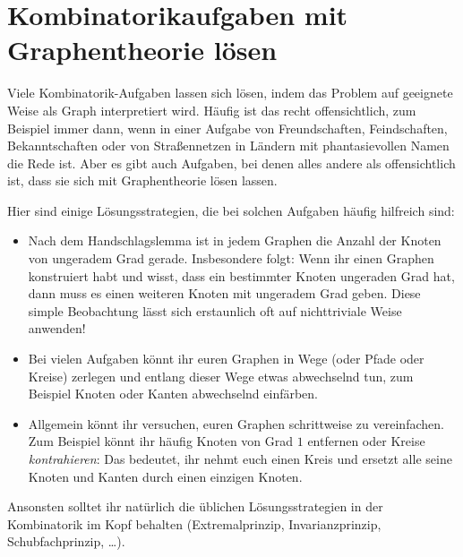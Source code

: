 \section{Kombinatorikaufgaben mit Graphentheorie lösen}\label{kapitel:GraphenInCombo}
Viele Kombinatorik-Aufgaben lassen sich lösen, indem das Problem auf geeignete Weise als Graph interpretiert wird. Häufig ist das recht offensichtlich, zum Beispiel immer dann, wenn in einer Aufgabe von Freundschaften, Feindschaften, Bekanntschaften oder von Straßennetzen in Ländern mit phantasievollen Namen die Rede ist. Aber es gibt auch Aufgaben, bei denen alles andere als offensichtlich ist, dass sie sich mit Graphentheorie lösen lassen.

Hier sind einige Lösungsstrategien, die bei solchen Aufgaben häufig hilfreich sind:
\begin{itemize}
	\item Nach dem Handschlagslemma ist in jedem Graphen die Anzahl der Knoten von ungeradem Grad gerade. Insbesondere folgt: Wenn ihr einen Graphen konstruiert habt und wisst, dass ein bestimmter Knoten ungeraden Grad hat, dann muss es einen weiteren Knoten mit ungeradem Grad geben. Diese simple Beobachtung lässt sich erstaunlich oft auf nichttriviale Weise anwenden!
	\item Bei vielen Aufgaben könnt ihr euren Graphen in Wege (oder Pfade oder Kreise) zerlegen und entlang dieser Wege etwas abwechselnd tun, zum Beispiel Knoten oder Kanten abwechselnd einfärben.
	\item Allgemein könnt ihr versuchen, euren Graphen schrittweise zu vereinfachen. Zum Beispiel könnt ihr häufig Knoten von Grad $1$ entfernen oder Kreise \emph{kontrahieren}: Das bedeutet, ihr nehmt euch einen Kreis und ersetzt alle seine Knoten und Kanten durch einen einzigen Knoten.
\end{itemize}
Ansonsten solltet ihr natürlich die üblichen Lösungsstrategien in der Kombinatorik im Kopf behalten (Extremalprinzip, Invarianzprinzip, Schubfachprinzip, \ldots).

